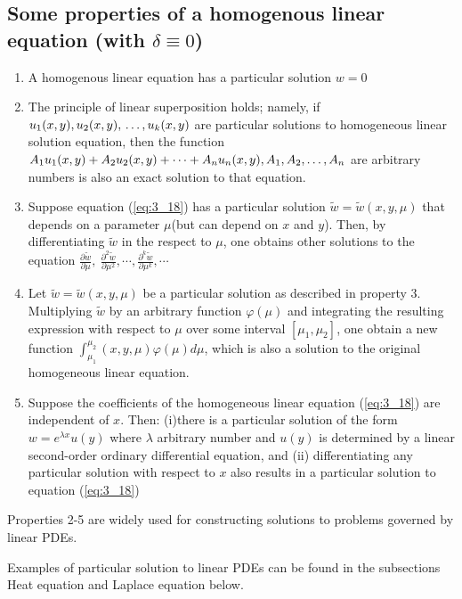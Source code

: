 \documentclass[11pt]{report}
\newcommand{\NI}{\noindent}
\newcommand{\sps}{\\[0.2cm]}
\newcommand{\refn}[1]{(\ref{#1})}
\newcommand{\refx}[1]{\refn{eq:#1}}
\newcommand{\dsp}{\displaystyle}
\newcommand{\tiw}{\widetilde{w}}
\begin{document}
	\subsection{Some properties of a homogenous linear equation (with $\delta \equiv 0$)}
	\begin{enumerate}
		\item A homogenous linear equation has a particular solution $w=0$
		\item The principle of linear superposition holds; namely, if $u_1(x,y),u_2(x,y),\\\ldots,u_k(x,y)$ are particular solutions to homogeneous linear solution equation, then the function $A_1u_1(x,y)+A_2u_2(x,y)+\cdots +A_nu_n(x,y),\\ A_1,A_2,\ldots,A_n$ are arbitrary numbers is also an exact solution to that equation.
		\item Suppose equation \refx{3_18} has a particular solution $\tiw = \tiw(x,y,\mu)$ that depends on a parameter $\mu$(but can depend on $x$ and $y$). Then, by differentiating $\tiw$ in the respect to $\mu$, one obtains other solutions to the equation $\dsp\frac{\partial\tiw}{\partial \mu},~\frac{\partial^2\tiw}{\partial \mu^2},\cdots,\frac{\partial^k\tiw}{\partial \mu^k},\cdots$
		\item Let $\tiw=\tiw(x,y,\mu)$ be a particular solution as described in property 3. Multiplying $\tiw$ by an arbitrary function $\varphi(\mu)$ and integrating the resulting expression with respect to $\mu$ over some interval $[\mu_1,\mu_2]$, one obtain a new function $\dsp\int_{\mu_1}^{\mu_2}(x,y,\mu)\varphi(\mu)d\mu$, which is also a solution to the original homogeneous linear equation.
		\item Suppose the coefficients of the homogeneous linear equation \refx{3_18} are independent of $x$. Then: (i)there is a particular solution of the form $w=e^{\lambda x}u(y)$ where $\lambda$ arbitrary number and $u(y)$ is determined by a linear second-order ordinary differential equation, and (ii) differentiating any particular solution with respect to $x$ also results in a particular solution to equation \refx{3_18}
	\end{enumerate}
	Properties 2-5 are widely used for constructing solutions to problems governed by linear PDEs.
	
	\NI Examples of particular solution to linear PDEs can be found in the subsections Heat equation and Laplace equation below.\sps
	
\end{document}
